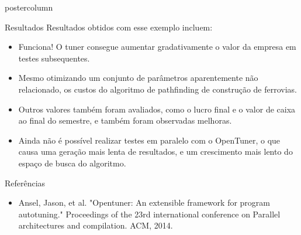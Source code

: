 \documentclass[final]{beamer}
\begin{document}
\begin{frame}
\begin{columns}
\begin{column}{.5\textwidth}
\begin{beamercolorbox}[center,wd=\textwidth]{postercolumn}
\begin{minipage}[T]{.95\textwidth}
{\begin{block}{Resultados}
                Resultados obtidos com esse exemplo incluem:
                \begin{itemize}
                  \item Funciona! O tuner consegue aumentar gradativamente o valor da empresa em testes subsequentes.
                  \item Mesmo otimizando um conjunto de parâmetros aparentemente não relacionado, os custos do algoritmo de pathfinding de construção de ferrovias.
                  \item Outros valores também foram avaliados, como o lucro final e o valor de caixa ao final do semestre, e também foram observadas melhoras.
                  \item Ainda não é possível realizar testes em paralelo com o OpenTuner, o que causa uma geração mais lenta de resultados, e um crescimento mais lento do espaço de busca do algoritmo.
                \end{itemize}
                
                \vspace*{0.2cm}
            \end{block}
            
%                
%                 
%                
%                
            
            \vspace*{0.2cm} 
            
            \begin{block}{Referências}
              \small
                \begin{itemize}
                    \item Ansel, Jason, et al. "Opentuner: An extensible framework for program autotuning." Proceedings of the 23rd international conference on Parallel architectures and compilation. ACM, 2014.
                \end{itemize}
                \vspace*{0.2cm} 
            \end{block}
            \vfill
          }
        \end{minipage}
      \end{beamercolorbox}
    \end{column}


  \end{columns}
\end{frame}
\end{document}
